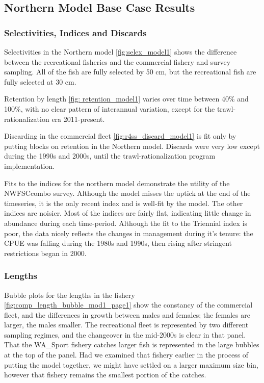 \documentclass[12pt,]{article}
\begin{document}
\clearpage

\subsection{Northern Model Base Case
Results}\label{northern-model-base-case-results}

\subsubsection{Selectivities, Indices and
Discards}\label{selectivities-indices-and-discards}

Selectivities in the Northern model \ref{fig:selex_model1} shows the
difference between the recreational fisheries and the commercial fishery
and survey sampling. All of the fish are fully selected by 50 cm, but
the recreational fish are fully selected at 30 cm.

Retention by length \ref{fig: retention_model1} varies over time between
40\% and 100\%, with no clear pattern of interannual variation, except
for the trawl-rationalization era 2011-present.

Discarding in the commercial fleet \ref{fig:r4ss_discard_model1} is fit
only by putting blocks on retention in the Northern model. Discards were
very low except during the 1990s and 2000s, until the
trawl-rationalization program implementation.

Fits to the indices for the northern model demonstrate the utility of
the NWFSCcombo survey. Although the model misses the uptick at the end
of the timeseries, it is the only recent index and is well-fit by the
model. The other indices are noisier. Most of the indices are fairly
flat, indicating little change in abundance during each time-period.
Although the fit to the Triennial index is poor, the data nicely
reflects the changes in management during it's tenure: the CPUE was
falling during the 1980s and 1990s, then rising after stringent
restrictions began in 2000.

\subsubsection{Lengths}\label{lengths}

Bubble plots for the lengths in the fishery
\ref{fig:comp_length_bubble_mod1_page1} show the constancy of the
commercial fleet, and the differences in growth between males and
females; the females are larger, the males smaller. The recreational
fleet is represented by two different sampling regimes, and the
changeover in the mid-2000s is clear in that panel. That the WA\_Sport
fishery catches larger fish is represented in the large bubbles at the
top of the panel. Had we examined that fishery earlier in the process of
putting the model together, we might have settled on a larger maximum
size bin, however that fishery remains the smallest portion of the
catches.
\end{document}
